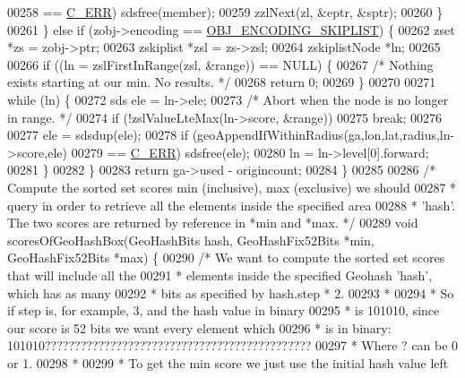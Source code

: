 \begin{DoxyCode}
{{00258                 == \hyperlink{server_8h_af98ac28d5f4d23d7ed5985188e6fb7d1}{C\_ERR}) sdsfree(member);
00259             zzlNext(zl, &eptr, &sptr);
00260         \}
00261     \} \textcolor{keywordflow}{else} \textcolor{keywordflow}{if} (zobj->encoding == \hyperlink{server_8h_acfb35db5cb30ed113ed23aeb1a224c4c}{OBJ\_ENCODING\_SKIPLIST}) \{
00262         zset *zs = zobj->ptr;
00263         zskiplist *zsl = zs->zsl;
00264         zskiplistNode *ln;
00265 
00266         \textcolor{keywordflow}{if} ((ln = zslFirstInRange(zsl, &range)) == NULL) \{
00267             \textcolor{comment}{/* Nothing exists starting at our min.  No results. */}
00268             \textcolor{keywordflow}{return} 0;
00269         \}
00270 
00271         \textcolor{keywordflow}{while} (ln) \{
00272             sds ele = ln->ele;
00273             \textcolor{comment}{/* Abort when the node is no longer in range. */}
00274             \textcolor{keywordflow}{if} (!zslValueLteMax(ln->score, &range))
00275                 \textcolor{keywordflow}{break};
00276 
00277             ele = sdsdup(ele);
00278             \textcolor{keywordflow}{if} (geoAppendIfWithinRadius(ga,lon,lat,radius,ln->score,ele)
00279                 == \hyperlink{server_8h_af98ac28d5f4d23d7ed5985188e6fb7d1}{C\_ERR}) sdsfree(ele);
00280             ln = ln->level[0].forward;
00281         \}
00282     \}
00283     \textcolor{keywordflow}{return} ga->used - origincount;
00284 \}
00285 
00286 \textcolor{comment}{/* Compute the sorted set scores min (inclusive), max (exclusive) we should}
00287 \textcolor{comment}{ * query in order to retrieve all the elements inside the specified area}
00288 \textcolor{comment}{ * 'hash'. The two scores are returned by reference in *min and *max. */}
00289 \textcolor{keywordtype}{void} scoresOfGeoHashBox(GeoHashBits hash, GeoHashFix52Bits *min, GeoHashFix52Bits *max) \{
00290     \textcolor{comment}{/* We want to compute the sorted set scores that will include all the}
00291 \textcolor{comment}{     * elements inside the specified Geohash 'hash', which has as many}
00292 \textcolor{comment}{     * bits as specified by hash.step * 2.}
00293 \textcolor{comment}{     *}
00294 \textcolor{comment}{     * So if step is, for example, 3, and the hash value in binary}
00295 \textcolor{comment}{     * is 101010, since our score is 52 bits we want every element which}
00296 \textcolor{comment}{     * is in binary: 101010?????????????????????????????????????????????}
00297 \textcolor{comment}{     * Where ? can be 0 or 1.}
00298 \textcolor{comment}{     *}
00299 \textcolor{comment}{     * To get the min score we just use the initial hash value left}
}}
\end{DoxyCode}
